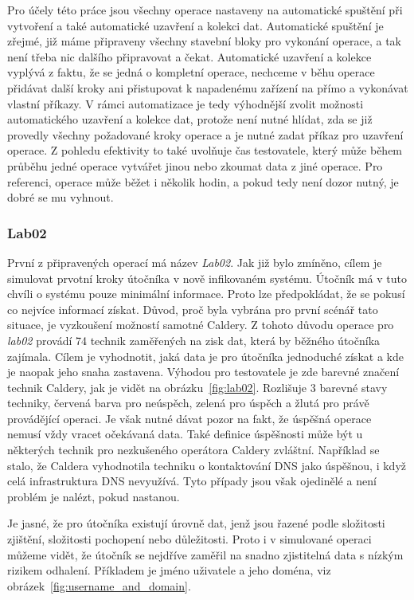 Pro účely této práce jsou všechny operace nastaveny na automatické spuštění při vytvoření a také automatické uzavření a kolekci dat.
Automatické spuštění je zřejmé, již máme připraveny všechny stavební bloky pro vykonání operace, a tak není třeba nic dalšího připravovat a čekat.
Automatické uzavření a kolekce vyplývá z faktu, že se jedná o kompletní operace, nechceme v běhu operace přidávat další kroky ani přistupovat k napadenému zařízení na přímo a vykonávat vlastní příkazy.
V rámci automatizace je tedy výhodnější zvolit možnosti automatického uzavření a kolekce dat, protože není nutné hlídat, zda se již provedly všechny požadované kroky operace a je nutné zadat příkaz pro uzavření operace.
Z pohledu efektivity to také uvolňuje čas testovatele, který může během průběhu jedné operace vytvářet jinou nebo zkoumat data z jiné operace.
Pro referenci, operace může běžet i několik hodin, a pokud tedy není dozor nutný, je dobré se mu vyhnout.

\subsubsection{Lab02}
První z připravených operací má název \textit{Lab02}.
Jak již bylo zmíněno, cílem je simulovat prvotní kroky útočníka v nově infikovaném systému.
Útočník má v tuto chvíli o systému pouze minimální informace.
Proto lze předpokládat, že se pokusí co nejvíce informací získat.
Důvod, proč byla vybrána pro první scénář tato situace, je vyzkoušení možností samotné Caldery.
Z tohoto důvodu operace pro \textit{lab02} provádí 74 technik zaměřených na zisk dat, která by běžného útočníka zajímala.
Cílem je vyhodnotit, jaká data je pro útočníka jednoduché získat a kde je naopak jeho snaha zastavena.
Výhodou pro testovatele je zde barevné značení technik Caldery, jak je vidět na obrázku~\ref{fig:lab02}.
Rozlišuje 3 barevné stavy techniky, červená barva pro neúspěch, zelená pro úspěch a žlutá pro právě provádějící operaci.
Je však nutné dávat pozor na fakt, že úspěšná operace nemusí vždy vracet očekávaná data.
Také definice úspěšnosti může být u některých technik pro nezkušeného operátora Caldery zvláštní.
Například se stalo, že Caldera vyhodnotila techniku o kontaktování \ac{DNS} jako úspěšnou, i když celá infrastruktura \ac{DNS} nevyužívá.
Tyto případy jsou však ojedinělé a není problém je nalézt, pokud nastanou.


Je jasné, že pro útočníka existují úrovně dat, jenž jsou řazené podle složitosti zjištění, složitosti pochopení nebo důležitosti.
Proto i v simulované operaci můžeme vidět, že útočník se nejdříve zaměřil na snadno zjistitelná data s nízkým rizikem odhalení.
Příkladem je jméno uživatele a jeho doména, viz obrázek~\ref{fig:username_and_domain}.

